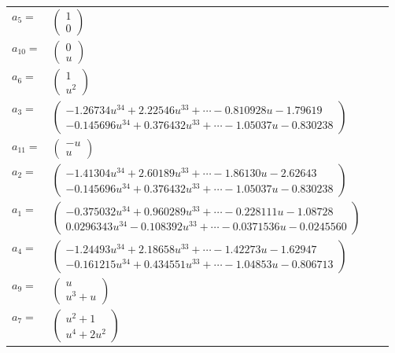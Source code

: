 \documentclass[1p]{elsarticle_modified}
\theoremstyle{definition}
\begin{document}
\begin{tabular}{m{7pt} m{180pt} m{7pt} m{180pt} }
\flushright $a_{5}=$&$\begin{pmatrix}1\\0\end{pmatrix}$ \\
\flushright $a_{10}=$&$\begin{pmatrix}0\\u\end{pmatrix}$ \\
\flushright $a_{6}=$&$\begin{pmatrix}1\\u^2\end{pmatrix}$ \\
\flushright $a_{3}=$&$\begin{pmatrix}-1.26734 u^{34}+2.22546 u^{33}+\cdots-0.810928 u-1.79619\\-0.145696 u^{34}+0.376432 u^{33}+\cdots-1.05037 u-0.830238\end{pmatrix}$ \\
\flushright $a_{11}=$&$\begin{pmatrix}- u\\u\end{pmatrix}$ \\
\flushright $a_{2}=$&$\begin{pmatrix}-1.41304 u^{34}+2.60189 u^{33}+\cdots-1.86130 u-2.62643\\-0.145696 u^{34}+0.376432 u^{33}+\cdots-1.05037 u-0.830238\end{pmatrix}$ \\
\flushright $a_{1}=$&$\begin{pmatrix}-0.375032 u^{34}+0.960289 u^{33}+\cdots-0.228111 u-1.08728\\0.0296343 u^{34}-0.108392 u^{33}+\cdots-0.0371536 u-0.0245560\end{pmatrix}$ \\
\flushright $a_{4}=$&$\begin{pmatrix}-1.24493 u^{34}+2.18658 u^{33}+\cdots-1.42273 u-1.62947\\-0.161215 u^{34}+0.434551 u^{33}+\cdots-1.04853 u-0.806713\end{pmatrix}$ \\
\flushright $a_{9}=$&$\begin{pmatrix}u\\u^3+u\end{pmatrix}$ \\
\flushright $a_{7}=$&$\begin{pmatrix}u^2+1\\u^4+2 u^2\end{pmatrix}$ \\

\end{tabular}
\end{document}
